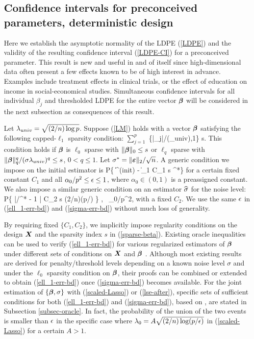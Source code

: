 \documentclass[11pt]{amsart}
\begin{document}
\subsection{Confidence {intervals} for preconceived parameters, deterministic design}
Here we establish the asymptotic normality of the LDPE (\ref{LDPE}) and the validity of 
the resulting confidence interval (\ref{LDPE-CI}) for a preconceived parameter. 
This result is new and useful in and of itself since high-dimensional data often present a few 
effects known to be of high interest in advance. 
Examples include treatment effects in clinical trials, or the effect of education 
on income in social-economical studies. 
Simultaneous confidence intervals for all individual $\beta_j$ and thresholded LDPE 
for the entire vector $\boldsymbol{\beta}$ will be considered in the next subsection 
as consequences of this result. 

Let $\lambda_{univ}=\sqrt{(2/n)\log p}$. 
Suppose (\ref{LM}) holds with a vector $\boldsymbol{\beta}$ 
satisfying the following capped-$\ell_1$ sparsity condition:  
\hbox{$\sum_{j=1}^p$} \min\big\{|\beta_j|/(\sigma\lam_{univ}),1\big\} \le s. 
\eel
This condition holds if $\boldsymbol{\beta}$ is $\ell_0$ sparse with $\|\boldsymbol{\beta}\|_0\le s$ 
or $\ell_q$ sparse with $\|\boldsymbol{\beta}\|_q^q/(\sigma\lambda_{univ})^q\le s$, $0<q\le 1$. 
Let $\sigma^*=\|\boldsymbol{\varepsilon}\|_2/\sqrt{n}$.  
A generic condition we impose on the initial estimator is 
P\Big\{ \|\hbbeta^{(init)} - \bbeta\|_1 \ge C_1 s \sigma^*\Big\} \le \eps
\eel
for a certain fixed constant $C_1$ and all $\alpha_0/p^2 \le \epsilon \le 1$, 
where $\alpha_0\in (0,1)$ is a preassigned constant. 
We also impose a similar generic condition on an estimator $\widehat{\sigma}$ for the noise level: 
P\Big\{ |\hsigma/\sigma^* - 1 | \ge C_2 s (2/n)\log(p/\eps) \Big\} \le \eps, \ 
\forall \alpha_0/p^2\le \eps{}, 
\eel 
with a fixed $C_2$. 
We use the same $\epsilon$ in (\ref{ell_1-err-bd}) and (\ref{sigma-err-bd}) without much loss of generality. 

By requiring fixed $\{C_1,C_2\}$, we implicitly impose regularity conditions 
on the design $\boldsymbol{X}$ and the sparsity index $s$ in (\ref{sparse-beta}). 
Existing oracle inequalities can be used to verify (\ref{ell_1-err-bd}) for various regularized 
estimators of $\boldsymbol{\beta}$ under different sets of conditions on $\boldsymbol{X}$ and $\boldsymbol{\beta}$ 
\cite{CandesT07,ZhangH08,BickelRT09,vandeGeerB09,
Zhang09-l1,Zhang10-mc+,YeZ10,SunZ11,ZhangZ11}.  
Although most existing results are derived for penalty/threshold levels depending on 
a known noise level $\sigma$ and under the $\ell_0$ sparsity condition on $\boldsymbol{\beta}$, 
their proofs can be combined or extended to obtain (\ref{ell_1-err-bd}) once (\ref{sigma-err-bd}) 
becomes available. 
For the joint estimation of $\{\boldsymbol{\beta},\sigma\}$ with (\ref{scaled-Lasso}) or (\ref{lse-after}), 
specific sets of sufficient conditions for both (\ref{ell_1-err-bd}) and (\ref{sigma-err-bd}), 
based on \cite{SunZ11}, are stated in Subsection \ref{subsec-oracle}. 
In fact, the probability of the union of the two events is smaller than 
$\epsilon$ in {the} specific case where $\lambda_0=A\sqrt{(2/n)\log(p/\epsilon)}$ 
in (\ref{scaled-Lasso}) for a certain $A>1$.
\end{document}
